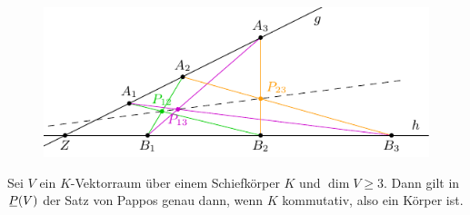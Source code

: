 \newpage

\begin{figure}[ht]
 \center
 \includegraphics[width=12cm]{img/pappos}
\end{figure}

\begin{thm}
 Sei $V$ ein $K$-Vektorraum über einem Schiefkörper $K$ und $\dim V \ge 3$. Dann gilt in $\proj(V)$ der Satz von Pappos genau dann, wenn $K$ kommutativ, also ein Körper ist.
\end{thm}


